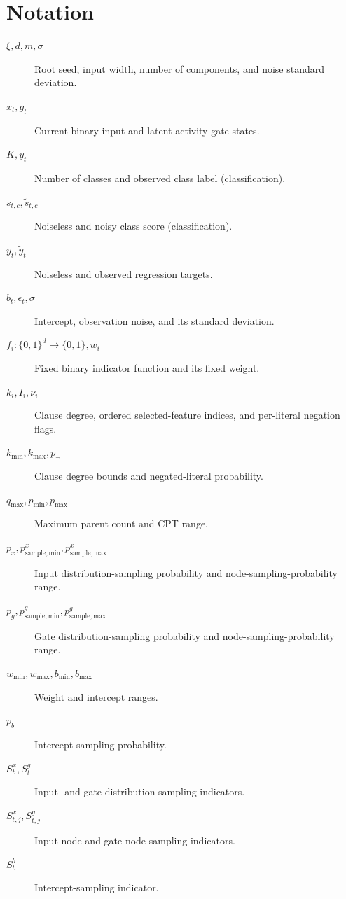 \documentclass[11pt]{article}
\begin{document}
\section{Notation}
\begin{description}
  \item[$\xi,d,m,\sigma$] Root seed, input width, number of components, and noise standard deviation.
  \item[$x_t,g_t$] Current binary input and latent activity-gate states.
  \item[$K,y_t$] Number of classes and observed class label (classification).
  \item[$s_{t,c},\tilde s_{t,c}$] Noiseless and noisy class score
  (classification).
  \item[$y_t,\tilde y_t$] Noiseless and observed regression targets.
  \item[$b_t,\epsilon_t,\sigma$] Intercept, observation noise, and its standard deviation.
  \item[$f_i:\{0,1\}^d\to\{0,1\},w_i$] Fixed binary indicator function and its fixed weight.
  \item[$k_i,I_i,\nu_i$] Clause degree, ordered selected-feature indices, and per-literal negation flags.
  \item[$k_{\min},k_{\max},p_{\neg}$] Clause degree bounds and negated-literal probability.
  \item[$q_{\max},p_{\min},p_{\max}$] Maximum parent count and CPT range.
  \item[$p_x,p_{\mathrm{sample,min}}^x,p_{\mathrm{sample,max}}^x$] Input distribution-sampling probability and node-sampling-probability range.
  \item[$p_g,p_{\mathrm{sample,min}}^g,p_{\mathrm{sample,max}}^g$] Gate distribution-sampling probability and node-sampling-probability range.
  \item[$w_{\min},w_{\max},b_{\min},b_{\max}$] Weight and intercept ranges.
  \item[$p_b$] Intercept-sampling probability.
  \item[$S_t^x,S_t^g$] Input- and gate-distribution sampling indicators.
  \item[$S_{t,j}^x,S_{t,j}^g$] Input-node and gate-node sampling indicators.
  \item[$S_t^b$] Intercept-sampling indicator.
\end{description}
\end{document}
